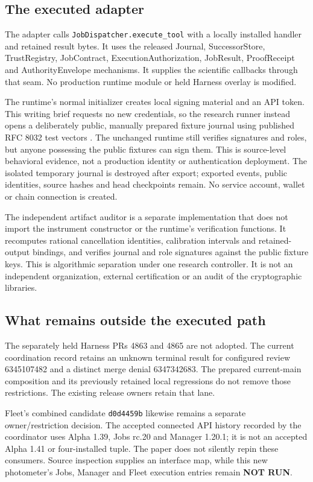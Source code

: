 \documentclass[11pt]{article}
\newcommand{\code}[1]{\texttt{#1}}
\newcommand{\status}[1]{\textsf{\textbf{#1}}}
\begin{document}
\subsection{The executed adapter}

The adapter calls \code{JobDispatcher.execute\_tool} with a locally installed handler and retained result bytes. It uses the released Journal, SuccessorStore, TrustRegistry, JobContract, ExecutionAuthorization, JobResult, ProofReceipt and AuthorityEnvelope mechanisms. It supplies the scientific callbacks through that seam. No production runtime module or held Harness overlay is modified.

The runtime's normal initializer creates local signing material and an API token. This writing brief requests no new credentials, so the research runner instead opens a deliberately public, manually prepared fixture journal using published RFC 8032 test vectors \cite{rfc8032}. The unchanged runtime still verifies signatures and roles, but anyone possessing the public fixtures can sign them. This is source-level behavioral evidence, not a production identity or authentication deployment. The isolated temporary journal is destroyed after export; exported events, public identities, source hashes and head checkpoints remain. No service account, wallet or chain connection is created.

The independent artifact auditor is a separate implementation that does not import the instrument constructor or the runtime's verification functions. It recomputes rational cancellation identities, calibration intervals and retained-output bindings, and verifies journal and role signatures against the public fixture keys. This is algorithmic separation under one research controller. It is not an independent organization, external certification or an audit of the cryptographic libraries.

\subsection{What remains outside the executed path}

The separately held Harness PRs 4863 and 4865 are not adopted. The current coordination record retains an unknown terminal result for configured review 6345107482 and a distinct merge denial 6347342683. The prepared current-main composition and its previously retained local regressions do not remove those restrictions. The existing release owners retain that lane.

Fleet's combined candidate \code{d0d4459b} likewise remains a separate owner/restriction decision. The accepted connected API history recorded by the coordinator uses Alpha 1.39, Jobs rc.20 and Manager 1.20.1; it is not an accepted Alpha 1.41 or four-installed tuple. The paper does not silently repin these consumers. Source inspection supplies an interface map, while this new photometer's Jobs, Manager and Fleet execution entries remain \status{NOT RUN}.
\end{document}
